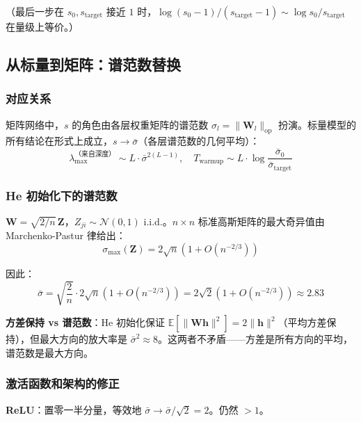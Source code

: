 \documentclass[12pt, a4paper]{ctexart}
\begin{document}
（最后一步在 $s_0, s_{\text{target}}$ 接近 $1$ 时，$\log(s_0-1)/(s_{\text{target}}-1) \sim \log s_0/s_{\text{target}}$ 在量级上等价。）

\subsection{从标量到矩阵：谱范数替换}

\subsubsection{对应关系}

矩阵网络中，$s$ 的角色由各层权重矩阵的谱范数 $\sigma_l = \|\mathbf{W}_l\|_{\text{op}}$ 扮演。标量模型的所有结论在形式上成立，$s \to \bar{\sigma}$（各层谱范数的几何平均）：
\begin{equation}
    \lambda_{\max}^{\text{（来自深度）}} \sim L \cdot \bar{\sigma}^{2(L-1)}, \quad T_{\text{warmup}} \sim L \cdot \log\frac{\bar{\sigma}_0}{\bar{\sigma}_{\text{target}}}
\end{equation}

\subsubsection{He 初始化下的谱范数}

$\mathbf{W} = \sqrt{2/n}\,\mathbf{Z}$，$Z_{ji} \sim \mathcal{N}(0,1)$ i.i.d.。$n \times n$ 标准高斯矩阵的最大奇异值由 Marchenko-Pastur 律给出：
\begin{equation}
    \sigma_{\max}(\mathbf{Z}) = 2\sqrt{n}\left(1 + O(n^{-2/3})\right)
\end{equation}

因此：
\begin{equation}
    \bar{\sigma} = \sqrt{\frac{2}{n}} \cdot 2\sqrt{n}\left(1 + O(n^{-2/3})\right) = 2\sqrt{2}\left(1 + O(n^{-2/3})\right) \approx 2.83
\end{equation}

\textbf{方差保持 vs 谱范数}：He 初始化保证 $\mathbb{E}[\|\mathbf{W}\mathbf{h}\|^2] = 2\|\mathbf{h}\|^2$（平均方差保持），但最大方向的放大率是 $\bar{\sigma}^2 \approx 8$。这两者不矛盾——方差是所有方向的平均，谱范数是最大方向。

\subsubsection{激活函数和架构的修正}

\textbf{ReLU}：置零一半分量，等效地 $\bar{\sigma} \to \bar{\sigma}/\sqrt{2} = 2$。仍然 $> 1$。
\end{document}
